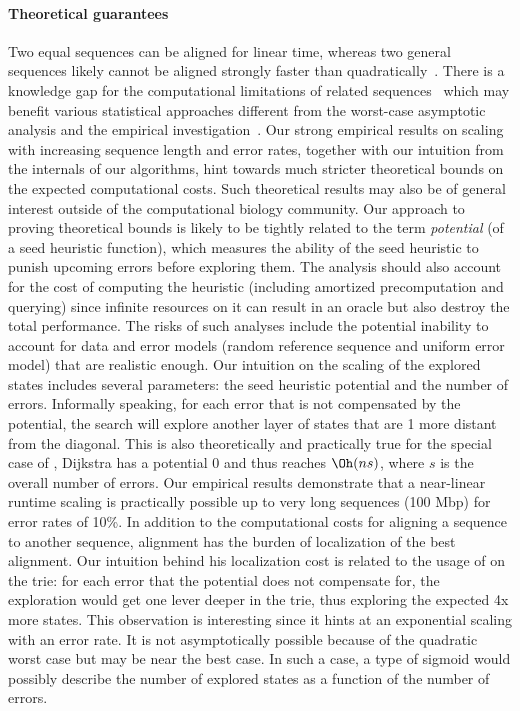 \paragraph{Theoretical guarantees}
Two equal sequences can be aligned for linear time, whereas two general
sequences likely cannot be aligned strongly faster than
quadratically~\cite{backurs2015edit}. There is a knowledge gap for the
computational limitations of related sequences~\citep{medvedev2022limitations}
which may benefit various statistical approaches different from the worst-case
asymptotic analysis and the empirical
investigation~\citep{medvedev2022theoretical}. Our strong empirical results on
scaling with increasing sequence length and error rates, together with our
intuition from the internals of our \A algorithms, hint towards much stricter
theoretical bounds on the expected computational costs. Such theoretical results
may also be of general interest outside of the computational biology community.
Our approach to proving theoretical bounds is likely to be tightly related to
the term \textit{potential} (of a seed heuristic function), which measures the
ability of the seed heuristic to punish upcoming errors before exploring them.
The analysis should also account for the cost of computing the heuristic
(including amortized precomputation and querying) since infinite resources on it
can result in an oracle but also destroy the total performance. The risks of
such analyses include the potential inability to account for data and error
models (random reference sequence and uniform error model) that are realistic
enough. Our intuition on the scaling of the explored states includes several
parameters: the seed heuristic potential and the number of errors. Informally
speaking, for each error that is not compensated by the potential, the \A search
will explore another layer of states that are 1 more distant from the diagonal.
This is also theoretically and practically true for the special case of \A,
Dijkstra has a potential 0 and thus reaches $\Oh(ns)$, where $s$ is the overall
number of errors. Our empirical results demonstrate that a near-linear runtime
scaling is practically possible up to very long sequences (100 Mbp) for error
rates of 10\%. In addition to the computational costs for aligning a sequence to
another sequence, alignment has the burden of localization of the best
alignment. Our intuition behind his localization cost is related to the usage of
\A on the trie: for each error that the \A potential does not compensate for,
the exploration would get one lever deeper in the trie, thus exploring the
expected 4x more states. This observation is interesting since it hints at an
exponential scaling with an error rate. It is not asymptotically possible
because of the quadratic worst case but may be near the best case. In
such a case, a type of sigmoid would possibly describe the number of explored
states as a function of the number of errors.

